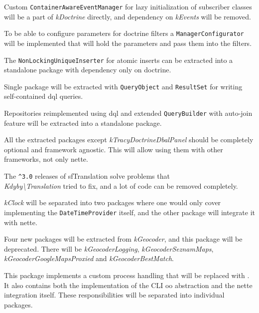Custom \lstinline{ContainerAwareEventManager} for lazy initialization of subscriber classes will be a part of \textit{\gls{kDoctrine}} directly, and dependency on \textit{\gls{kEvents}} will be removed.

To be able to configure parameters for \gls{doctrine} filters a \lstinline{ManagerConfigurator} will be implemented that will hold the parameters and pass them into the filters.

The \lstinline{NonLockingUniqueInserter} for atomic inserts can be extracted into a standalone package with dependency only on \gls{doctrine}.

Single package will be extracted with \lstinline{QueryObject} and \lstinline{ResultSet} for writing self-contained \gls{dql} queries.

Repositories reimplemented using \gls{dql} and extended \lstinline{QueryBuilder} with auto-join feature will be extracted into a standalone package.

All the extracted packages except \textit{\gls{kTracyDoctrineDbalPanel}} should be completely optional and framework agnostic. This will allow using them with other frameworks, not only \gls{nette}.


The \lstinline{^3.0} releases of \gls{sfTranslation} solve problems that \\\textit{Kdyby\textbackslash{}Translation} tried to fix, and a lot of code can be removed completely.


\textit{\gls{kClock}} will be separated into two packages where one would only cover implementing the \lstinline{DateTimeProvider} itself, and the other package will integrate it with \gls{nette}.


Four new packages will be extracted from \textit{\gls{kGeocoder}}, and this package will be deprecated. There will be \textit{\gls{kGeocoderLogging}}, \textit{\gls{kGeocoderSeznamMaps}}, \textit{\gls{kGeocoderGoogleMapsProxied}} and \textit{\gls{kGeocoderBestMatch}}.


This package implements a custom process handling that will be replaced with . It also contains both the implementation of the CLI \gls{oo} abstraction and the \gls{nette} integration itself. These responsibilities will be separated into individual packages.
